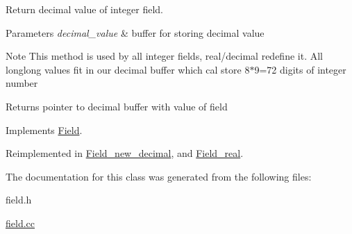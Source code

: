 Return decimal value of integer field.


\begin{DoxyParams}{Parameters}
{\em decimal\+\_\+value} & buffer for storing decimal value\\
\hline
\end{DoxyParams}
\begin{DoxyNote}{Note}
This method is used by all integer fields, real/decimal redefine it. All longlong values fit in our decimal buffer which cal store 8$\ast$9=72 digits of integer number
\end{DoxyNote}
\begin{DoxyReturn}{Returns}
pointer to decimal buffer with value of field 
\end{DoxyReturn}


Implements \mbox{\hyperlink{classField}{Field}}.



Reimplemented in \mbox{\hyperlink{classField__new__decimal_a17f916c175e3c2520609d911574d9bde}{Field\+\_\+new\+\_\+decimal}}, and \mbox{\hyperlink{classField__real_aea0b139caebcb6dc909b1bc397f5aba6}{Field\+\_\+real}}.



The documentation for this class was generated from the following files\+:\begin{DoxyCompactItemize}
\item 
field.\+h\item 
\mbox{\hyperlink{field_8cc}{field.\+cc}}\end{DoxyCompactItemize}
